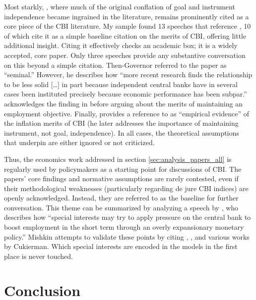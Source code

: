 \documentclass[12pt,a4paper]{article}
\begin{document}
\begin{doublespace}
Most starkly, \textcite{alesina_central_1993}, where much of the original conflation of goal and instrument independence became ingrained in the literature, remains prominently cited as a core piece of the CBI literature. My sample found 13 speeches that reference \textcite{alesina_central_1993}, 10 of which cite it as a simple baseline citation on the merits of CBI, offering little additional insight. Citing it effectively checks an academic box; it is a widely accepted, core paper. Only three speeches provide any substantive conversation on this beyond a simple citation. Then-Governor \textcite{powell_audit_2015} referred to the paper as ``seminal.'' However, he describes how ``more recent research finds the relationship to be less solid [\dots] in part because independent central banks have in several cases been instituted precisely because economic performance has been subpar.'' \textcite{kugler_central_2024} acknowledges the finding in \textcite{alesina_central_1993} before arguing about the merits of maintaining an employment objective. Finally, \textcite{powell_panel_2023} provides a reference to \textcite{alesina_central_1993} as ``empirical evidence'' of the inflation merits of CBI (he later addresses the importance of maintaining instrument, not goal, independence). In all cases, the theoretical assumptions that underpin \textcite{alesina_central_1993} are either ignored or not criticized. 


Thus, the economics work addressed in section \ref{sec:analysis_papers_all} is regularly used by policymakers as a starting point for discussions of CBI. The papers' core findings and normative assumptions are rarely contested, even if their methodological weaknesses (particularly regarding de jure CBI indices) are openly acknowledged. Instead, they are referred to as the baseline for further conversation. This theme can be summarized by analyzing a speech by \textcite{mishkin_central_2008}, who describes how ``special interests may try to apply pressure on the central bank to boost employment in the short term through an overly expansionary monetary policy.'' Mishkin attempts to validate these points by citing \textcite{alesina_central_1993}, \textcite{kydland_rules_1977}, and various works by Cukierman. Which special interests are encoded in the models in the first place is never touched. 



\section{Conclusion}
\label{sec:conclusion}


\end{doublespace}
\end{document}
